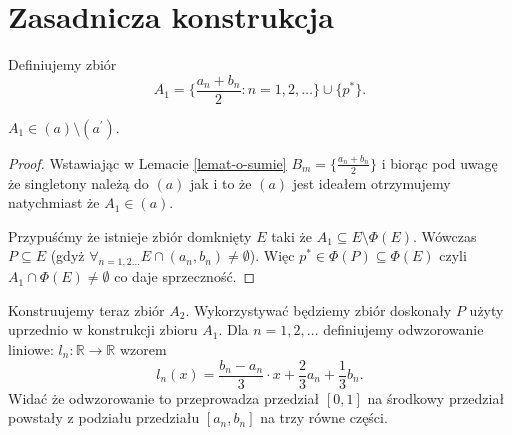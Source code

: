 \documentclass[12pt]{amsart}
\theoremstyle{plain}
\theoremstyle{definition}
\theoremstyle{remark}
\newcommand{\real}{\mathbb{R}}
\newcommand{\aideal}{\mathit{(a)}}
\newcommand{\aidealprime}{\mathit{(a^\prime)}}
\begin{document}
\section{Zasadnicza konstrukcja}

Definiujemy zbiór
\[ A_1 = \lbrace \frac{a_n + b_n}{2} \colon n = 1,2,\ldots\rbrace \cup \lbrace p^* \rbrace.
\]

 $A_1 \in \aideal \setminus \aidealprime$.
\begin{proof}
Wstawiając w Lemacie \ref{lemat-o-sumie} 
$B_m = \lbrace \frac{a_n + b_n}{2} \rbrace$
i biorąc pod uwagę że singletony należą do $\aideal$ jak i to że
$\aideal$ jest ideałem otrzymujemy natychmiast że $A_1 \in \aideal$.

\smallskip

Przypuśćmy że istnieje zbiór domknięty $E$ taki że
$A_1 \subseteq E \setminus \Phi(E)$.
Wówczas $P \subseteq E$ (gdyż $\forall_{n=1,2\ldots} E \cap (a_n, b_n) \not= \emptyset$).
Więc $p^* \in \Phi(P) \subseteq \Phi(E)$ czyli $A_1 \cap \Phi(E) \not= \emptyset$
co daje sprzeczność.
\end{proof}

Konstruujemy teraz zbiór $A_2$.
Wykorzystywać będziemy zbiór doskonały $P$
użyty uprzednio w konstrukcji zbioru $A_1$.
Dla $n = 1,2,\ldots$ definiujemy odwzorowanie liniowe:
$l_n\colon \real\to\real$ wzorem
\[l_n(x) = \frac{b_n - a_n}{3} \cdot x + \frac{2}{3} a_n + \frac{1}{3} b_n.\]
Widać że odwzorowanie to przeprowadza przedział $[0,1]$ na
środkowy przedział powstały z podziału przedziału $[a_n, b_n]$ na trzy
równe części.
\end{document}
